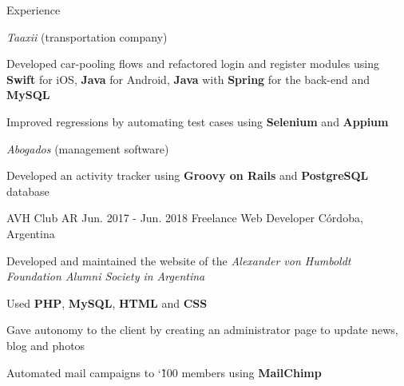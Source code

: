\documentclass{curriculum}
\begin{document}
\begin{cvsection}{Experience}
\begin{sectionitemlist}
        \item{\textit{Taaxii} (transportation company)}
            \begin{sectionitemlist}
            \item{
                Developed car-pooling flows and refactored login and register
                modules using \textbf{Swift} for iOS, \textbf{Java} for Android,
                \textbf{Java} with \textbf{Spring} for the back-end and \textbf{MySQL}
            }
            \item{
                Improved regressions by automating test cases
                using \textbf{Selenium} and \textbf{Appium}
            }
            \end{sectionitemlist}

        \item{\textit{Abogados} (management software)}
            \begin{sectionitemlist}
            \item{
                Developed an activity tracker using
                \textbf{Groovy on Rails} and \textbf{PostgreSQL} database
            }
            \end{sectionitemlist}

        \end{sectionitemlist}


    \makesectionitemheader
        {AVH Club AR}                                       {Jun. 2017 - Jun. 2018}
        {Freelance Web Developer}                              {Córdoba, Argentina}

        \begin{sectionitemlist}
        \item{
            Developed and maintained the website of the
            \textit{Alexander von Humboldt Foundation Alumni Society in Argentina}
        }
        \item{
            Used \textbf{PHP}, \textbf{MySQL}, \textbf{HTML} and \textbf{CSS}
        }
        \item{
            Gave autonomy to the client by creating
            an administrator page to update news, blog and photos
        }
        \item{
            Automated mail campaigns to  \char`\~ 100
            members using \textbf{MailChimp}
        }
        \end{sectionitemlist}

\end{cvsection}
\end{document}
